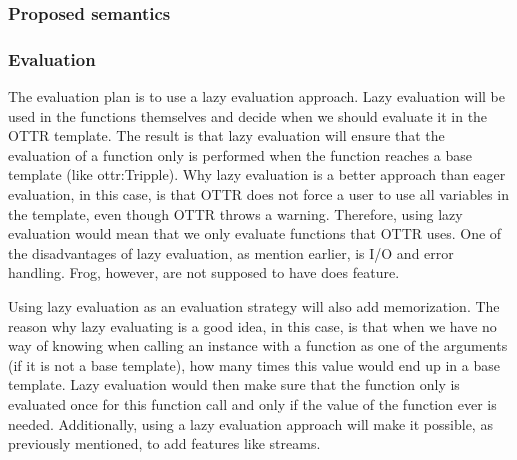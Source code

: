 \subsubsection{Proposed semantics}

\subsubsection{Evaluation}
The evaluation plan is to use a lazy evaluation approach. Lazy evaluation will be used in the functions themselves and decide when we should evaluate it in the OTTR template. The result is that lazy evaluation will ensure that the evaluation of a function only is performed when the function reaches a base template (like ottr:Tripple). Why lazy evaluation is a better approach than eager evaluation, in this case, is that OTTR does not force a user to use all variables in the template, even though OTTR throws a warning. Therefore, using lazy evaluation would mean that we only evaluate functions that OTTR uses. One of the disadvantages of lazy evaluation, as mention earlier, is I/O and error handling. Frog, however, are not supposed to have does feature. 

\para
Using lazy evaluation as an evaluation strategy will also add memorization. The reason why lazy evaluating is a good idea, in this case, is that when we have no way of knowing when calling an instance with a function as one of the arguments (if it is not a base template), how many times this value would end up in a base template. Lazy evaluation would then make sure that the function only is evaluated once for this function call and only if the value of the function ever is needed. Additionally, using a lazy evaluation approach will make it possible, as previously mentioned, to add features like streams. 

